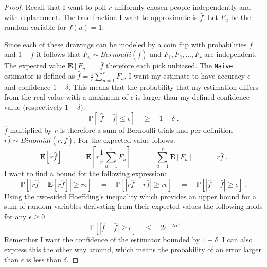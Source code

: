\begin{proof}
Recall that I want to poll $r$ uniformly chosen people independently and with replacement. The true fraction I want to approximate is $\bar{f}$. Let $F_u$ be the random variable for $f(u) = 1$.

Since each of these drawings can be modeled by a coin flip with probabilities $\bar{f}$ and $1-\bar{f}$ it follows that $F_u \sim  Bernoulli(\bar{f})$ and $F_1, F_2, \ldots , F_r$ are independent. The expected value $\textbf{E}[F_u] = \bar{f}$ therefore each pick unbiased.
The \texttt{Naive} estimator is defined as $\hat{f} = \frac{1}{r}\sum_{u=1}^{r} F_u$.
I want my estimate to have accuracy $\epsilon$ and confidence $1-\delta$. This means that the probability that my estimation differs from the real value with a maximum of $\epsilon$ is larger than my defined confidence value (respectively $1-\delta$):
$$\mathds{P}[|\hat{f}-\bar{f} | \leq \epsilon] \quad\geq\quad 1-\delta \;.$$
$\hat{f}$ multiplied by $r$ is therefore a sum of Bernoulli trials and per definition $r\hat{f} \sim Binomial(r,\bar{f})$. For the expected value follows:
$$\textbf{E}[r\hat{f}] \quad=\quad \textbf{E}[r\frac{1}{r}\sum_{u=1}^{r} F_u] \quad=\quad \sum_{u=1}^{r}\textbf{E}[F_u] \quad=\quad r\bar{f}\;.$$
I want to find a bound for the following expression:
$$\mathds{P}[|r\hat{f}-\textbf{E}[r\hat{f}]| \geq r\epsilon] \quad=\quad \mathds{P}[|r\hat{f}-r\bar{f}| \geq r\epsilon] \quad=\quad \mathds{P}[|\hat{f}-\bar{f}| \geq \epsilon]\;.$$ 
Using the two-sided Hoeffding's inequality which provides an upper bound for a sum of random variables derivating from their expected values the following holds for any $\epsilon \geq 0$
$$\quad \mathds{P}[|\hat{f}-\bar{f}|\geq \epsilon] \quad\leq\quad 2e^{-2r\epsilon^2}\;.$$
Remember I want the confidence of the estimator bounded by $1-\delta$. I can also express this the other way around, which means the probability of an error larger than $\epsilon$ is less than $\delta$.

\end{proof}
